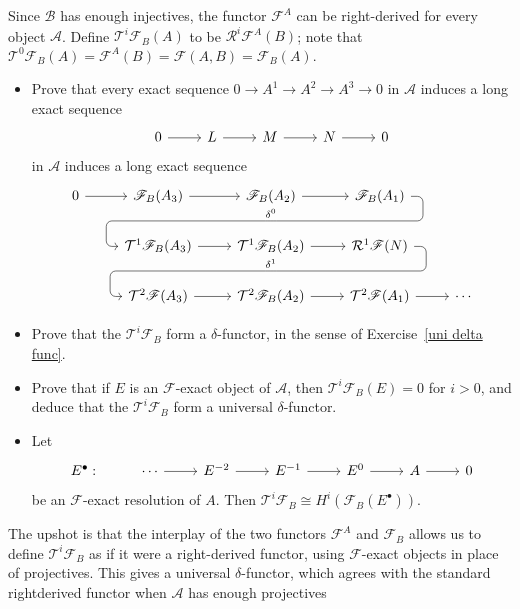 \begin{exercise}
Since $\mathcal{B}$ has enough injectives, the functor $\mathscr{F}^A$ can be right-derived for every object $\mathcal{A}$. Define $\mathcal{T}^i\mathscr{F}_B(A)$ to be $\mathcal{R}^i\mathscr{F}^A(B)$; note that $\mathcal{T}^0\mathscr{F}_B(A)=\mathscr{F}^A(B)=\mathscr{F}(A,B)=\mathscr{F}_B(A)$.
\begin{itemize}
\item Prove that every exact sequence $0\to A^1\to A^2\to A^3\to 0$ in $\mathcal{A}$ induces a long exact sequence
\[\begin{tikzcd}
0\ar[r]&L\ar[r]&M\ar[r]&N\ar[r]&0
\end{tikzcd}\]
in $\mathcal{A}$ induces a long exact sequence
\[\begin{tikzcd}
0\ar[r]&\mathscr{F}_B(A_3)\ar[r]&\mathscr{F}_B(A_2)\rar
\ar[draw=none]{d}[name=X, anchor=center]{}
&\mathscr{F}_B(A_1)\ar[rounded corners,swap,
to path={ -- ([xshift=2ex]\tikztostart.east)
	|- (X.center) \tikztonodes
	-| ([xshift=-2ex]\tikztotarget.west)
	-- (\tikztotarget)}]{dll}[at end]{\delta^0}&\\      
&\mathcal{T}^1\mathscr{F}_B(A_3)\rar &\mathcal{T}^1\mathscr{F}_B(A_2)\ar[draw=none]{d}[name=Y, anchor=center]{}\rar &\mathcal{R}^1\mathscr{F}(N)\ar[rounded corners,swap,
to path={ -- ([xshift=2ex]\tikztostart.east)
	|- (Y.center) \tikztonodes
	-| ([xshift=-2ex]\tikztotarget.west)
	-- (\tikztotarget)}]{dll}[at end]{\delta^1}&\\
&\mathcal{T}^2\mathscr{F}(A_3)\rar &\mathcal{T}^2\mathscr{F}_B(A_2)\rar &\mathcal{T}^2\mathscr{F}(A_1)\ar[r]&\cdots
\end{tikzcd}\]
\item Prove that the $\mathcal{T}^i\mathscr{F}_B$ form a $\delta$-functor, in the sense of Exercise~\ref{uni delta func}.
\item Prove that if $E$ is an $\mathscr{F}$-exact object of $\mathcal{A}$, then $\mathcal{T}^i\mathscr{F}_B(E)=0$ for $i>0$, and
deduce that the $\mathcal{T}^i\mathscr{F}_B$ form a universal $\delta$-functor.
\item Let 
\[\begin{tikzcd}
E^\bullet:&\cdots\ar[r]&E^{-2}\ar[r]&E^{-1}\ar[r]&E^0\ar[r]&A\ar[r]&0
\end{tikzcd}\]
be an $\mathscr{F}$-exact resolution of $A$. Then $\mathcal{T}^i\mathscr{F}_B\cong H^i(\mathscr{F}_B(E^\bullet))$.
\end{itemize}
The upshot is that the interplay of the two functors $\mathscr{F}^A$ and $\mathscr{F}_B$ allows us to define $\mathcal{T}^i\mathscr{F}_B$ as if it were a right-derived functor, using $\mathscr{F}$-exact objects in place of projectives. This gives a universal $\delta$-functor, which agrees with the standard rightderived functor when $\mathcal{A}$ has enough projectives
\end{exercise}
